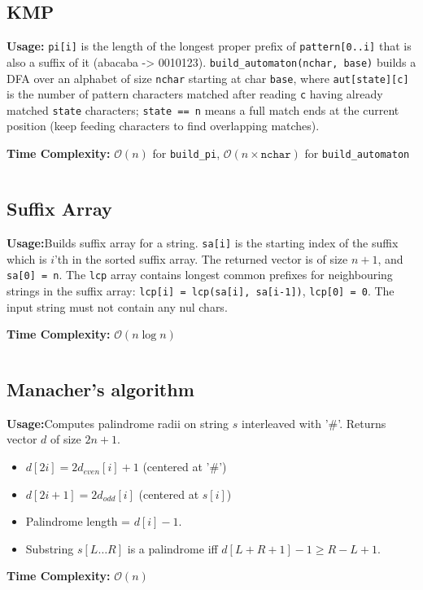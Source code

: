   \subsection{KMP}
    \par \textbf{Usage:} \texttt{pi[i]} is the length of the longest proper prefix of \texttt{pattern[0..i]} that is also a suffix of it (abacaba -> 0010123). \texttt{build\_automaton(nchar, base)} builds a DFA over an alphabet of size \texttt{nchar} starting at char \texttt{base}, where \texttt{aut[state][c]} is the number of pattern characters matched after reading \texttt{c} having already matched \texttt{state} characters; \texttt{state == n} means a full match ends at the current position (keep feeding characters to find overlapping matches).
    \par \textbf{Time Complexity:} $\mathcal{O}(n)$ for \texttt{build\_pi}, $\mathcal{O}(n \times \texttt{nchar})$ for \texttt{build\_automaton}
    \inputminted{cpp}{library/strings/kmp.hpp}
  \subsection{Suffix Array}
    \par \textbf{Usage:}Builds suffix array for a string.
 \texttt{sa[i]} is the starting index of the suffix which
 is $i$'th in the sorted suffix array.
 The returned vector is of size $n+1$, and \texttt{sa[0] = n}.
 The \texttt{lcp} array contains longest common prefixes for
 neighbouring strings in the suffix array:
 \texttt{lcp[i] = lcp(sa[i], sa[i-1])}, \texttt{lcp[0] = 0}.
 The input string must not contain any nul chars.
    \par \textbf{Time Complexity:} $\mathcal{O}(n \log n)$
    \inputminted{cpp}{library/strings/suffix_array.hpp}

  \subsection{Manacher's algorithm}
    \par \textbf{Usage:}Computes palindrome radii on string $s$ interleaved with '\#'. Returns vector $d$ of size $2n+1$.
    \begin{itemize}
        \item $d[2i] = 2d_{even}[i] + 1$ (centered at '\#')
        \item $d[2i + 1] = 2d_{odd}[i]$ (centered at $s[i]$)
        \item Palindrome length = $d[i] - 1$.
        \item Substring $s[L \dots R]$ is a palindrome iff $d[L + R + 1] - 1 \ge R - L + 1$.
    \end{itemize}
    \par \textbf{Time Complexity:} $\mathcal{O}(n)$
    \inputminted{cpp}{library/strings/manacher.hpp}


